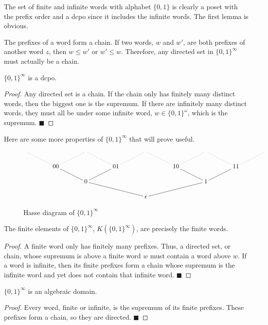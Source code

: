 The set of finite and infinite words with alphabet $\{0,1\}$ is clearly a poset with the prefix order and a dcpo since it includes the infinite words.  The first lemma is obvious.  


\begin{lemma} \label{prefixchain}
The prefixes of a word form a chain.  If two words, $w$ and $w'$, are both prefixes of another word $z$, then $w\leq w'$ or $w'\leq w$.  Therefore, any directed set in $\{0,1\}^\infty$ must actually be a chain.
\end{lemma}

\begin{lemma}
$\{0,1\}^\infty$ is a dcpo.
\end{lemma}
\begin{proof}
Any directed set is a chain.  If the chain only has finitely many distinct words, then the biggest one is the supremum.  If there are infinitely many distinct words, they must all be under some infinite word, $w\in \{0,1\}^\omega$, which is the supremum.
\hfill $\blacksquare$
\end{proof}
Here are some more properties of $\{0,1\}^\infty$ that will prove useful.

\begin{figure}
\[
\xymatrix@!0@C=4pc{
& & & & & & & &\\
&00\ar@{..}[ul]\ar@{..}[ur] & & 01\ar@{..}[ul]\ar@{..}[ur] & & 10\ar@{..}[ul]\ar@{..}[ur] & & 11\ar@{..}[ul]\ar@{..}[ur] & \\
& & 0\ar@{-}[ul]\ar@{-}[ur] & & & & 1\ar@{-}[ul]\ar@{-}[ur] \\
& & & & \epsilon\ar@{-}[ull]\ar@{-}[urr] \\
}
\]
\caption{Hasse diagram of $\{0,1\}^\infty$}
\end{figure}

\begin{lemma}
The finite elements of $\{0,1\}^\infty$, $K(\{0,1\}^\infty)$, are precisely the finite words.
\end{lemma}
\begin{proof}
A finite word only has finitely many prefixes.  Thus, a directed set, or chain, whose supremum is above a finite word $w$ must contain a word above $w$.  If a word is infinite, then its finite prefixes form a chain whose supremum is the infinite word and yet does not contain that infinite word. \hfill $\blacksquare$
\end{proof}

\begin{proposition}
$\{0,1\}^\infty$ is an algebraic domain.
\end{proposition}
\begin{proof}
Every word, finite or infinite, is the supremum of its finite prefixes.  These prefixes form a chain, so they are directed.
\hfill $\blacksquare$
\end{proof}

